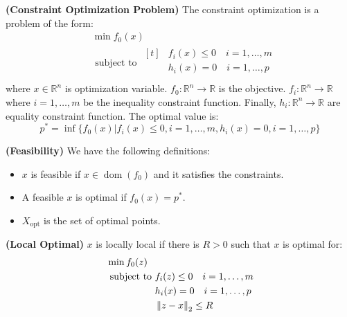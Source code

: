 \begin{definition}{\textbf{(Constraint Optimization Problem)}}
    The constraint optimization is a problem of the form:
    \begin{equation*}
    \begin{aligned}
        &\min f_0(x) \\
        &\text{ subject to } \begin{aligned}[t]
            &f_i(x)\le0 \quad i=1,\dots,m \\
            &h_i(x)=0 \quad i=1,\dots,p \\
        \end{aligned}
    \end{aligned}
    \end{equation*}
    where $x\in \mathbb{R}^n$ is optimization variable. $f_0:\mathbb{R}^n\rightarrow \mathbb{R}$ is the objective. $f_i : \mathbb{R}^n\rightarrow \mathbb{R}$ where $i=1,\dots,m$ be the inequality constraint function. Finally, $h_i:\mathbb{R}^n\rightarrow \mathbb{R}$ are equality constraint function. The optimal value is:
    \begin{equation*}
        p^* = \inf \Big\{ f_0(x) \Big| f_i(x)\le0, i=1,\dots,m, h_i(x)=0, i=1,\dots,p \Big\}
    \end{equation*}
\end{definition}

\begin{definition}{\textbf{(Feasibility)}}
    We have the following definitions:
    \begin{itemize}
        \item $x$ is feasible if $x\in\operatorname{dom}(f_0)$ and it satisfies the constraints. 
        \item A feasible $x$ is optimal if $f_0(x) = p^*$. 
        \item $X_{\operatorname{opt}}$ is the set of optimal points.
    \end{itemize}
\end{definition}

\begin{definition}{\textbf{(Local Optimal)}}
    $x$ is locally local if there is $R>0$ such that $x$ is optimal for:
    \begin{equation*}
    \begin{aligned}
        &\min f_0(z) \\
        &\text{ subject to } \begin{aligned}[t]
            &f_i(z)\le0 \quad i=1,\dots,m \\
            &h_i(x)=0 \quad i=1,\dots,p \\
            &\left\lVert z-x\right\rVert_2\le R
        \end{aligned}
    \end{aligned}
    \end{equation*} 
\end{definition}

